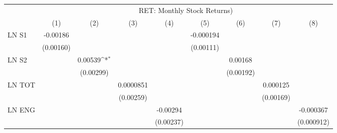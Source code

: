 {
\def\sym#1{\ifmmode^{#1}\else\(^{#1}\)\fi}
\begin{tabular}{l*{8}{c}}
\hline\hline
                    &\multicolumn{8}{c}{RET: Monthly Stock Returns) }                                                                                                                               \\\cmidrule(lr){2-9}
                    &\multicolumn{1}{c}{(1)}         &\multicolumn{1}{c}{(2)}         &\multicolumn{1}{c}{(3)}         &\multicolumn{1}{c}{(4)}         &\multicolumn{1}{c}{(5)}         &\multicolumn{1}{c}{(6)}         &\multicolumn{1}{c}{(7)}         &\multicolumn{1}{c}{(8)}         \\
\hline
LN S1               &    -0.00186         &                     &                     &                     &   -0.000194         &                     &                     &                     \\
                    &   (0.00160)         &                     &                     &                     &   (0.00111)         &                     &                     &                     \\
LN S2               &                     &     0.00539\sym{*}  &                     &                     &                     &     0.00168         &                     &                     \\
                    &                     &   (0.00299)         &                     &                     &                     &   (0.00192)         &                     &                     \\
LN TOT              &                     &                     &   0.0000851         &                     &                     &                     &    0.000125         &                     \\
                    &                     &                     &   (0.00259)         &                     &                     &                     &   (0.00169)         &                     \\
LN ENG              &                     &                     &                     &    -0.00294         &                     &                     &                     &   -0.000367         \\
                    &                     &                     &                     &   (0.00237)         &                     &                     &                     &  (0.000912)         \\

\end{tabular}}
